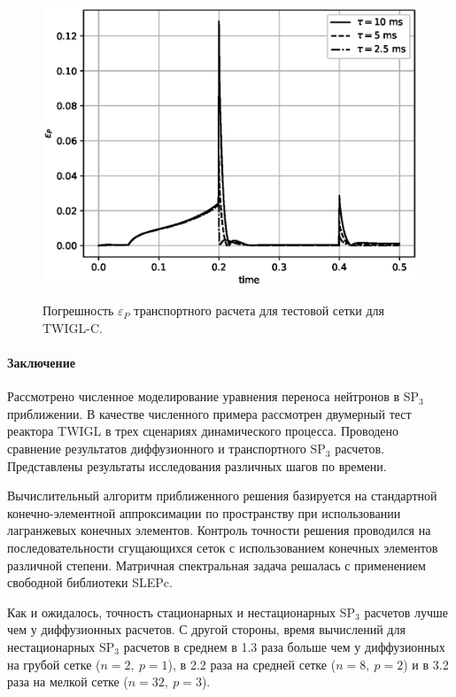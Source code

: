 \documentclass{crm-article}
\begin{document}
\begin{figure}[ht]
\begin{center}
	\includegraphics[width=0.4\linewidth]{sp3_tau_c.eps}\\
	\caption{\label{image:canonsummary} Погрешность $\varepsilon_P$ транспортного расчета для тестовой сетки для TWIGL-C.}
	\label{ris:sp3_tau_c}
\end{center}
\end{figure}
	
\paragraph{Заключение}

Рассмотрено численное моделирование уравнения переноса нейтронов в SP$_3$ приближении.
В качестве численного примера рассмотрен двумерный тест реактора TWIGL в трех сценариях динамического процесса.
Проводено сравнение результатов диффузионного и транспортного SP$_3$ расчетов. 
Представлены результаты исследования различных шагов по времени.

Вычислительный алгоритм приближенного решения базируется на стандартной конечно-элементной аппроксимации по пространству при использовании лагранжевых конечных элементов.
Контроль точности решения проводился на последовательности сгущающихся сеток с использованием конечных элементов различной степени.
Матричная спектральная задача решалась с применением свободной библиотеки SLEPc.

Как и ожидалось, точность стационарных и нестационарных SP$_3$ расчетов лучше чем у диффузионных расчетов. 
С другой стороны, время вычислений для нестационарных SP$_3$ расчетов в среднем в 1.3 раза больше чем у диффузионных на грубой сетке ($n=2,\ p=1$), в 2.2 раза на средней сетке ($n=8,\ p=2$) и в 3.2 раза на мелкой сетке ($n=32,\ p=3$).
\end{document}
